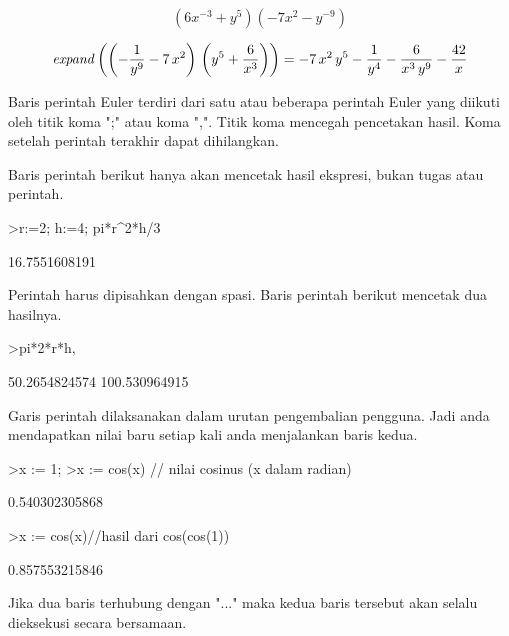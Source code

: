 \documentclass[a4paper,10pt]{article}
\begin{document}
\begin{eulernotebook}
\begin{eulercomment}
\end{eulercomment}
\begin{eulerformula}
\[
(6x^{-3}+y^5)(-7x^2-y^{-9})
\]
\end{eulerformula}
\begin{eulerformula}
\[
{\it expand}\left(\left(-\frac{1}{y^9}-7\,x^2\right)\,\left(y^5+
 \frac{6}{x^3}\right)\right)=-7\,x^2\,y^5-\frac{1}{y^4}-\frac{6}{x^3
 \,y^9}-\frac{42}{x}
\]
\end{eulerformula}
\begin{eulercomment}
\end{eulercomment}
\begin{eulercomment}
Baris perintah Euler terdiri dari satu atau beberapa perintah Euler
yang diikuti oleh titik koma ";" atau koma ",".  Titik koma mencegah
pencetakan hasil.  Koma setelah perintah terakhir dapat dihilangkan.

Baris perintah berikut hanya akan mencetak hasil ekspresi, bukan tugas
atau perintah.
\end{eulercomment}
\begin{eulerprompt}
>r:=2; h:=4; pi*r^2*h/3
\end{eulerprompt}
\begin{euleroutput}
  16.7551608191
\end{euleroutput}
\begin{eulercomment}
Perintah harus dipisahkan dengan spasi.  Baris perintah berikut
mencetak dua hasilnya.
\end{eulercomment}
\begin{eulerprompt}
>pi*2*r*h, %
\end{eulerprompt}
\begin{euleroutput}
  50.2654824574
  100.530964915
\end{euleroutput}
\begin{eulercomment}
Garis perintah dilaksanakan dalam urutan pengembalian pengguna.  Jadi
anda mendapatkan nilai baru setiap kali anda menjalankan baris kedua.
\end{eulercomment}
\begin{eulerprompt}
>x := 1;
>x := cos(x) // nilai cosinus (x dalam radian)
\end{eulerprompt}
\begin{euleroutput}
  0.540302305868
\end{euleroutput}
\begin{eulerprompt}
>x := cos(x)//hasil dari cos(cos(1))
\end{eulerprompt}
\begin{euleroutput}
  0.857553215846
\end{euleroutput}
\begin{eulercomment}
Jika dua baris terhubung dengan "..." maka kedua baris tersebut akan
selalu dieksekusi secara bersamaan.


\end{eulercomment}
\end{eulernotebook}
\end{document}
